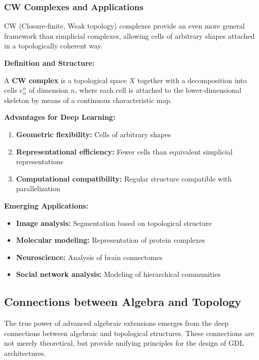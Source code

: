 \subsubsection{CW Complexes and Applications}

CW (Closure-finite, Weak topology) complexes provide an even more general framework than simplicial complexes, allowing cells of arbitrary shapes attached in a topologically coherent way.

\textbf{Definition and Structure:}

\begin{definition}[CW Complex]
A \textbf{CW complex} is a topological space $X$ together with a decomposition into cells $e^n_\alpha$ of dimension $n$, where each cell is attached to the lower-dimensional skeleton by means of a continuous characteristic map.
\end{definition}

\textbf{Advantages for Deep Learning:}
\begin{enumerate}
    \item \textbf{Geometric flexibility:} Cells of arbitrary shapes
    \item \textbf{Representational efficiency:} Fewer cells than equivalent simplicial representations
    \item \textbf{Computational compatibility:} Regular structure compatible with parallelization
\end{enumerate}

\textbf{Emerging Applications:}
\begin{itemize}
    \item \textbf{Image analysis:} Segmentation based on topological structure
    \item \textbf{Molecular modeling:} Representation of protein complexes
    \item \textbf{Neuroscience:} Analysis of brain connectomes
    \item \textbf{Social network analysis:} Modeling of hierarchical communities
\end{itemize}

\subsection{Connections between Algebra and Topology}

The true power of advanced algebraic extensions emerges from the deep connections between algebraic and topological structures. These connections are not merely theoretical, but provide unifying principles for the design of \gls{GDL} architectures.

